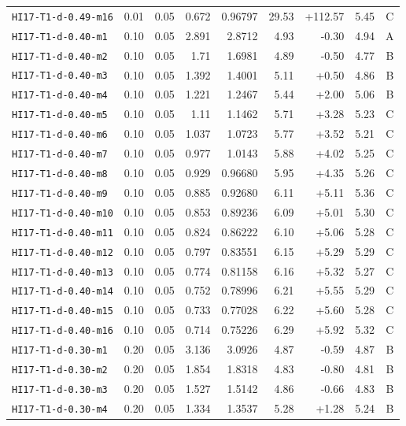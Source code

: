 \begin{longtable}{@{}lrrrrrrrc@{}}
\texttt{HI17-T1-d-0.49-m16} & 0.01 & 0.05 & 0.672 & 0.96797 & 29.53 & +112.57 & 5.45 & C\\
\texttt{HI17-T1-d-0.40-m1} & 0.10 & 0.05 & 2.891 & 2.8712 & 4.93 & -0.30 & 4.94 & A\\
\texttt{HI17-T1-d-0.40-m2} & 0.10 & 0.05 & 1.71 & 1.6981 & 4.89 & -0.50 & 4.77 & B\\
\texttt{HI17-T1-d-0.40-m3} & 0.10 & 0.05 & 1.392 & 1.4001 & 5.11 & +0.50 & 4.86 & B\\
\texttt{HI17-T1-d-0.40-m4} & 0.10 & 0.05 & 1.221 & 1.2467 & 5.44 & +2.00 & 5.06 & B\\
\texttt{HI17-T1-d-0.40-m5} & 0.10 & 0.05 & 1.11 & 1.1462 & 5.71 & +3.28 & 5.23 & C\\
\texttt{HI17-T1-d-0.40-m6} & 0.10 & 0.05 & 1.037 & 1.0723 & 5.77 & +3.52 & 5.21 & C\\
\texttt{HI17-T1-d-0.40-m7} & 0.10 & 0.05 & 0.977 & 1.0143 & 5.88 & +4.02 & 5.25 & C\\
\texttt{HI17-T1-d-0.40-m8} & 0.10 & 0.05 & 0.929 & 0.96680 & 5.95 & +4.35 & 5.26 & C\\
\texttt{HI17-T1-d-0.40-m9} & 0.10 & 0.05 & 0.885 & 0.92680 & 6.11 & +5.11 & 5.36 & C\\
\texttt{HI17-T1-d-0.40-m10} & 0.10 & 0.05 & 0.853 & 0.89236 & 6.09 & +5.01 & 5.30 & C\\
\texttt{HI17-T1-d-0.40-m11} & 0.10 & 0.05 & 0.824 & 0.86222 & 6.10 & +5.06 & 5.28 & C\\
\texttt{HI17-T1-d-0.40-m12} & 0.10 & 0.05 & 0.797 & 0.83551 & 6.15 & +5.29 & 5.29 & C\\
\texttt{HI17-T1-d-0.40-m13} & 0.10 & 0.05 & 0.774 & 0.81158 & 6.16 & +5.32 & 5.27 & C\\
\texttt{HI17-T1-d-0.40-m14} & 0.10 & 0.05 & 0.752 & 0.78996 & 6.21 & +5.55 & 5.29 & C\\
\texttt{HI17-T1-d-0.40-m15} & 0.10 & 0.05 & 0.733 & 0.77028 & 6.22 & +5.60 & 5.28 & C\\
\texttt{HI17-T1-d-0.40-m16} & 0.10 & 0.05 & 0.714 & 0.75226 & 6.29 & +5.92 & 5.32 & C\\
\texttt{HI17-T1-d-0.30-m1} & 0.20 & 0.05 & 3.136 & 3.0926 & 4.87 & -0.59 & 4.87 & B\\
\texttt{HI17-T1-d-0.30-m2} & 0.20 & 0.05 & 1.854 & 1.8318 & 4.83 & -0.80 & 4.81 & B\\
\texttt{HI17-T1-d-0.30-m3} & 0.20 & 0.05 & 1.527 & 1.5142 & 4.86 & -0.66 & 4.83 & B\\
\texttt{HI17-T1-d-0.30-m4} & 0.20 & 0.05 & 1.334 & 1.3537 & 5.28 & +1.28 & 5.24 & B\\

\end{longtable}
